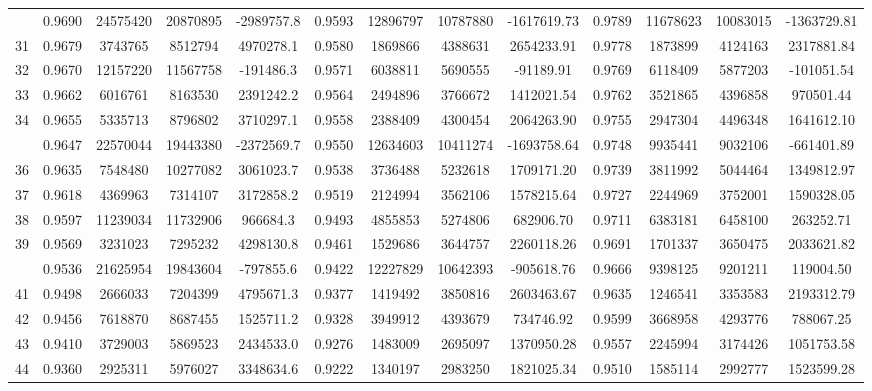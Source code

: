 \documentclass[
  12pt,
]{article}
\begin{document}
\begin{longtable}[t]{lcccccccccccc}
\addlinespace
30 & 0.9690 & 24575420 & 20870895 & -2989757.8 & 0.9593 & 12896797 & 10787880 & -1617619.73 & 0.9789 & 11678623 & 10083015 & -1363729.81\\
31 & 0.9679 & 3743765 & 8512794 & 4970278.1 & 0.9580 & 1869866 & 4388631 & 2654233.91 & 0.9778 & 1873899 & 4124163 & 2317881.84\\
32 & 0.9670 & 12157220 & 11567758 & -191486.3 & 0.9571 & 6038811 & 5690555 & -91189.91 & 0.9769 & 6118409 & 5877203 & -101051.54\\
33 & 0.9662 & 6016761 & 8163530 & 2391242.2 & 0.9564 & 2494896 & 3766672 & 1412021.54 & 0.9762 & 3521865 & 4396858 & 970501.44\\
34 & 0.9655 & 5335713 & 8796802 & 3710297.1 & 0.9558 & 2388409 & 4300454 & 2064263.90 & 0.9755 & 2947304 & 4496348 & 1641612.10\\
\addlinespace
35 & 0.9647 & 22570044 & 19443380 & -2372569.7 & 0.9550 & 12634603 & 10411274 & -1693758.64 & 0.9748 & 9935441 & 9032106 & -661401.89\\
36 & 0.9635 & 7548480 & 10277082 & 3061023.7 & 0.9538 & 3736488 & 5232618 & 1709171.20 & 0.9739 & 3811992 & 5044464 & 1349812.97\\
37 & 0.9618 & 4369963 & 7314107 & 3172858.2 & 0.9519 & 2124994 & 3562106 & 1578215.64 & 0.9727 & 2244969 & 3752001 & 1590328.05\\
38 & 0.9597 & 11239034 & 11732906 & 966684.3 & 0.9493 & 4855853 & 5274806 & 682906.70 & 0.9711 & 6383181 & 6458100 & 263252.71\\
39 & 0.9569 & 3231023 & 7295232 & 4298130.8 & 0.9461 & 1529686 & 3644757 & 2260118.26 & 0.9691 & 1701337 & 3650475 & 2033621.82\\
\addlinespace
40 & 0.9536 & 21625954 & 19843604 & -797855.6 & 0.9422 & 12227829 & 10642393 & -905618.76 & 0.9666 & 9398125 & 9201211 & 119004.50\\
41 & 0.9498 & 2666033 & 7204399 & 4795671.3 & 0.9377 & 1419492 & 3850816 & 2603463.67 & 0.9635 & 1246541 & 3353583 & 2193312.79\\
42 & 0.9456 & 7618870 & 8687455 & 1525711.2 & 0.9328 & 3949912 & 4393679 & 734746.92 & 0.9599 & 3668958 & 4293776 & 788067.25\\
43 & 0.9410 & 3729003 & 5869523 & 2434533.0 & 0.9276 & 1483009 & 2695097 & 1370950.28 & 0.9557 & 2245994 & 3174426 & 1051753.58\\
44 & 0.9360 & 2925311 & 5976027 & 3348634.6 & 0.9222 & 1340197 & 2983250 & 1821025.34 & 0.9510 & 1585114 & 2992777 & 1523599.28\\

\end{longtable}
\end{document}
